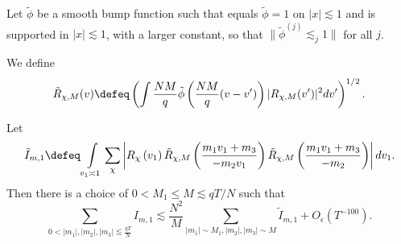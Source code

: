 Let $\tilde{\phi}$ be a smooth bump function such that equals $\tilde{\phi}=1$ on $|x|\lesssim 1$ and is supported in $|x|\lesssim 1$, with a larger constant, so that $\|\tilde{\phi}^{(j)}\lesssim_j 1\|$ for all $j$.

We define \[
\tilde{R}_{\chi,M}(v) \defeq \left( \int \frac{NM}{q}\tilde{\phi}\left(\frac{NM}{q}(v-v')\right)|{R}_{\chi,M}(v')|^2 dv'\right)^{1/2}.
\]
\begin{proposition} \label{dyadics_31}
    Let \[
    \tilde{I}_{m,1}\defeq 
    \int\displaylimits_{v_1\asymp 1} \sum_{\chi} \left|R_\chi\left(v_1\right) \tilde{R}_{\chi,M}\left(\frac{m_1v_1+m_3}{-m_2v_1}\right)
\tilde{R}_{\chi,M}\left(\frac{m_1v_1+m_3}{-m_2}\right)\right|dv_1.
    \]
    Then there is a choice of $0<M_1\leq M \lesssim qT/N$ such that \[
        \sum_{0<|m_1|,|m_2|,|m_3|\lesssim \frac{qT}{N}} I_{m,1}\lesssim \frac{N^2}{M}\sum_{|m_1|\sim M_1,|m_2|,|m_3|\sim M}\tilde{I}_{m,1}+O_\epsilon(T^{-100}).
    \]
\end{proposition}

